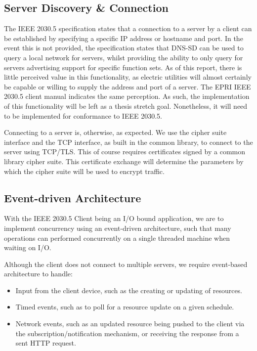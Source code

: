 \subsection{Server Discovery \& Connection}
The IEEE 2030.5 specification states that a connection to a server by a client can be established by specifying a specific IP address or hostname and port.
In the event this is not provided, the specification states that DNS-SD can be used to query a local network for servers, whilst providing the ability to only query for servers advertising support for specific function sets.
As of this report, there is little perceived value in this functionality, as electric utilities will almost certainly be capable or willing to supply the address and port of a server.
The EPRI IEEE 2030.5 client manual indicates the same perception.\cite[]{eprimanual}
As such, the implementation of this functionality will be left as a thesis stretch goal. Nonetheless, it will need to be implemented for conformance to IEEE 2030.5.

Connecting to a server is, otherwise, as expected. We use the cipher suite interface and the TCP interface, as built in the common library, to connect to the server using TCP/TLS.
This of course requires certificates signed by a common library cipher suite. This certificate exchange will determine the parameters by which the cipher suite will be used to encrypt traffic.

\subsection{Event-driven Architecture}
With the IEEE 2030.5 Client being an I/O bound application, we are to implement concurrency using an event-driven architecture, such that many operations can performed concurrently on a single threaded machine when waiting on I/O.

Although the client does not connect to multiple servers, we require event-based architecture to handle:
\begin{itemize}
    \item Input from the client device, such as the creating or updating of resources.
    \item Timed events, such as to poll for a resource update on a given schedule.
    \item Network events, such as an updated resource being pushed to the client via the subscription/notification mechanism, or receiving the response from a sent HTTP request.
\end{itemize}

